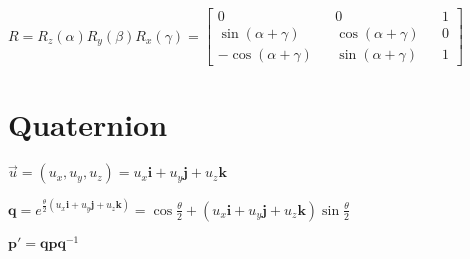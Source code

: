 \documentclass{article}
\begin{document}
$
R = R_z(\alpha) R_y(\beta) R_x(\gamma)
=
\begin{bmatrix}
    0 && 0 && 1 \\
    \sin(\alpha+\gamma) && \cos(\alpha+\gamma) && 0\\
    -\cos(\alpha+\gamma) && \sin(\alpha+\gamma) && 1
\end{bmatrix}
$

\section*{Quaternion}
$
\vec{u} = (u_x, u_y, u_z) = u_x \mathbf{i} + u_y \mathbf{j} + u_z \mathbf{k}
$

$
\mathbf{q} = e^{\frac{\theta}{2}(u_x \mathbf{i} + u_y \mathbf{j} + u_z \mathbf{k})}
= 
\cos \frac{\theta}{2} + (u_x \mathbf{i} + u_y \mathbf{j} + u_z \mathbf{k}) \sin \frac{\theta}{2}
$

$
\mathbf{p}'=\mathbf{q}\mathbf{p}\mathbf{q}^{-1}
$
\end{document}
